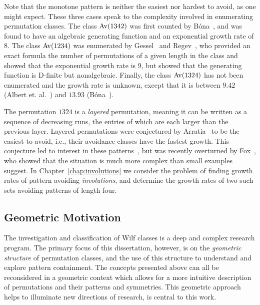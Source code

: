    Note that the monotone pattern is neither the easiest nor hardest to avoid,
    as one might expect.  These three cases speak to the complexity involved in
    enumerating permutation classes. The class $\operatorname{{Av}}(1342)$ was first counted by
    B\'ona~\cite{Bona1997}, and was found to have an algebraic generating
    function and an exponential growth rate  of $8$. The class $\operatorname{{Av}}(1234)$ was
    enumerated by Gessel~\cite{Gessel1990} and Regev~\cite{Regev}, who provided
    an exact formula the number of permutations of a given length in the class
    and showed that the exponential growth rate is $9$, but showed that the
    generating function is D-finite but nonalgebraic. Finally, the class
    $\operatorname{{Av}}(1324)$ has not been enumerated and the growth rate is unknown, except
    that it is between $9.42$ (Albert et.  al.~\cite{1324LowerBound}) and
    $13.93$ (B\'ona~\cite{1324UpperBound}). 

    The permutation $1324$ is a \emph{layered} permutation, meaning it can be
    written as a sequence of decreasing runs, the entries of which are each
    larger than the previous layer. Layered permutations were conjectured by
    Arratia~\cite{Arratia1999} to be the easiest to avoid, i.e., their
    avoidance classes have the fastest growth. This conjecture led to interest
    in these patterns~\cite{Claesson2012, Bona2007, Elder2005}, but was
    recently overturned by Fox~\cite{Fox}, who showed that the situation is
    much more complex than small examples suggest. 
    In Chapter~\ref{chap:involutions}
    we consider the problem of finding growth rates of pattern avoiding
    \emph{involutions}, and determine the growth rates of two such sets
    avoiding patterns of length four. 
    


 

  \subsection{Geometric Motivation}
    
    The investigation and classification of Wilf classes is a deep and complex
    research program.  The primary focus of this dissertation, however, is on
    the \emph{geometric structure} of permutation classes, and the use of this
    structure to understand and explore pattern containment. The concepts
    presented above can all be reconsidered in a geometric context which allows
    for a more intuitive description of permutations
    and their patterns and symmetries. This geometric approach helps to
    illuminate new directions of research, is central to this work. 


